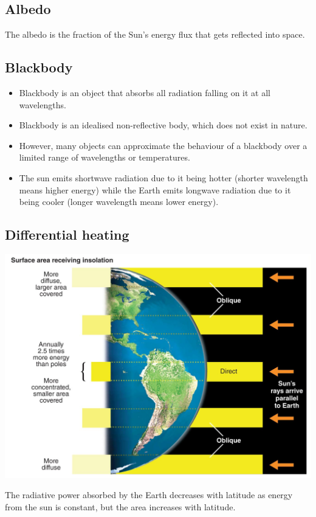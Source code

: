 \documentclass[11pt]{article}
\begin{document}
\subsection{Albedo}
\label{sec:org6fe7ce8}
The albedo is the fraction of the Sun's energy flux that gets reflected into space.

\newpage
\subsection{Blackbody}
\label{sec:orgdc6a75f}
\begin{itemize}
\item Blackbody is an object that absorbs all radiation falling on it at all wavelengths.
\item Blackbody is an idealised non-reflective body, which does not exist in nature.
\item However, many objects can approximate the behaviour of a blackbody over a limited range of wavelengths or temperatures.
\item The sun emits shortwave radiation due to it being hotter (shorter wavelength means higher energy) while the Earth emits longwave radiation due to it being cooler (longer wavelength means lower energy).
\end{itemize}
\subsection{Differential heating}
\label{sec:orgc096335}
\begin{center}
\includegraphics[width=.9\linewidth]{./images/differential-heating.png}
\end{center}

 \noindent The radiative power absorbed by the Earth decreases with latitude as energy from the sun is constant, but the area increases with latitude.
\end{document}
